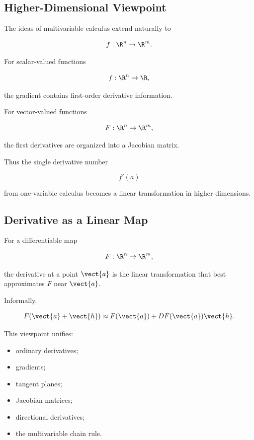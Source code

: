 \subsection{Higher-Dimensional Viewpoint}
\label{subsec:higher-dimensional-multivariable}

The ideas of multivariable calculus extend naturally to

\[ f:\R^n\to\R^m. \]

For scalar-valued functions

\[ f:\R^n\to\R, \]

the gradient contains first-order derivative information.

For vector-valued functions

\[ F:\R^n\to\R^m, \]

the first derivatives are organized into a Jacobian matrix.

Thus the single derivative number

\[ f'(a) \]

from one-variable calculus becomes a linear transformation in higher
dimensions.

\subsection{Derivative as a Linear Map}
\label{subsec:derivative-linear-map}

For a differentiable map

\[ F:\R^n\to\R^m, \]

the derivative at a point \(\vect{a}\) is the linear transformation that best
approximates \(F\) near \(\vect{a}\).

Informally,

\[ F(\vect{a}+\vect{h})
\approx
F(\vect{a})+DF(\vect{a})\vect{h}. \]

This viewpoint unifies:

\begin{itemize}
    \item ordinary derivatives;
    \item gradients;
    \item tangent planes;
    \item Jacobian matrices;
    \item directional derivatives;
    \item the multivariable chain rule.
\end{itemize}

